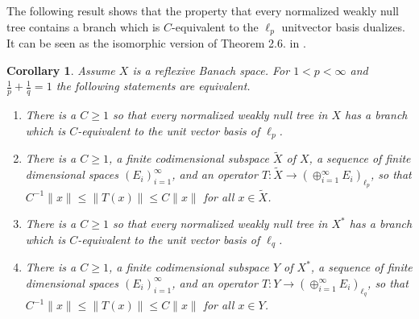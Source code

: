 \documentclass[11pt,leqno]{amsart}
\newtheorem{cor}[thm]{Corollary}
\theoremstyle{definition}
\newcommand{\tX}{\tilde X}
\begin{document}
The following result shows that the property that every normalized
weakly null tree contains a branch which is $C$-equivalent to 
the $\ell_p$ unitvector basis dualizes.
It can be seen as the isomorphic version of Theorem 2.6. in \cite{KW}. 
     
\begin{cor}\label{cor:4.5}
Assume $X$ is a reflexive Banach space.
For $1<p<\infty$ and $\frac1p +\frac1q =1$ the following
statements are equivalent.
\begin{enumerate}
\item[a)] There is a $C\ge 1$ so that every normalized weakly null
tree in $X$ has a branch which is $C$-equivalent to the  unit
vector basis of $\ell_p$.
\item[b)] There is a $C\ge 1$, a finite codimensional subspace $\tX$ of $X$, 
a sequence of finite dimensional spaces $(E_i)_{i=1}^\infty$,
and an operator $T:\tX\to(\oplus_{i=1}^\infty E_i)_{\ell_p}$, so that
$C^{-1}\|x\|\le \|T(x)\|\le C\|x\|$ for all $x\in \tilde X$.
\item[c)] There is a $C\ge 1$ so that every normalized weakly null
tree in $X^*$ has a branch which is $C$-equivalent to the  unit
vector basis of $\ell_q$.
\item[d)] There is a $C\ge 1$, a finite codimensional subspace $Y$ of $X^*$, 
a sequence of finite dimensional spaces $(E_i)_{i=1}^\infty$,
and an operator $T:Y\to(\oplus_{i=1}^\infty E_i)_{\ell_q}$, so that
$C^{-1}\|x\|\le \|T(x)\|\le C\|x\|$ for all $x\in Y$. 
\end{enumerate}
\end{cor}
\end{document}
